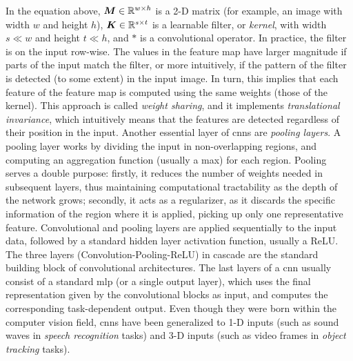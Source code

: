 In the equation above, $\Matrix{M} \in \Real^{w \times h}$ is a 2-D matrix (for example, an image with width $w$ and height $h$), $\Matrix{K} \in \Real^{s \times t}$ is a learnable filter, or \emph{kernel}, with width $s \ll w$ and height $t \ll h$, and $*$ is a convolutional operator. In practice, the filter is  on the input row-wise. The values in the feature map have larger magnitude if parts of the input match the filter, or more intuitively, if the pattern of the filter is detected (to some extent) in the input image. In turn, this implies that each feature of the feature map is computed using the same weights (those of the kernel). This approach is called \emph{weight sharing}, and it implements \emph{translational invariance}, which intuitively means that the features are detected regardless of their position in the input. Another essential layer of \glspl{cnn} are \emph{pooling layers}. A pooling layer works by dividing the input in non-overlapping regions, and computing an aggregation function (usually a max) for each region. Pooling serves a double purpose: firstly, it reduces the number of weights needed in subsequent layers, thus maintaining computational tractability as the depth of the network grows; secondly, it acts as a regularizer, as it discards the specific information of the region where it is applied, picking up only one representative feature. Convolutional and pooling layers are applied sequentially to the input data, followed by a standard hidden layer activation function, usually a ReLU. The three layers (Convolution-Pooling-ReLU) in cascade are the standard building block of convolutional architectures. The last layers of a \gls{cnn} usually consist of a standard \gls{mlp} (or a single output layer), which uses the final representation given by the convolutional blocks as input, and computes the corresponding task-dependent output. Even though they were born within the computer vision field, \glspl{cnn} have been generalized to 1-D inputs (such as sound waves in \emph{speech recognition} tasks) and 3-D inputs (such as video frames in \emph{object tracking} tasks).

